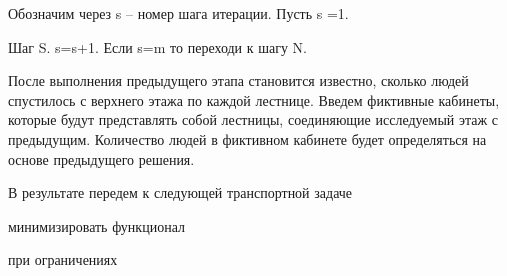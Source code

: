 Обозначим через s -- номер шага итерации. Пусть s =1.

Шаг S. s=s+1. Если s=m то переходи к шагу N.

После выполнения предыдущего этапа становится известно, сколько людей
спустилось с верхнего этажа по каждой лестнице. Введем фиктивные
кабинеты, которые будут представлять собой лестницы, соединяющие
исследуемый этаж с предыдущим. Количество людей в фиктивном кабинете
будет определяться на основе предыдущего решения.

В результате передем к следующей транспортной задаче

минимизировать функционал


при ограничениях

% 
% 
% 

